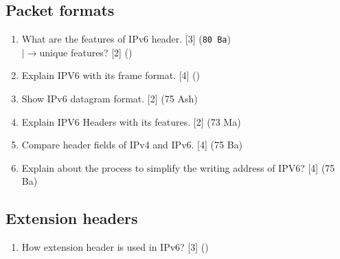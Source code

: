 \documentclass[12pt]{article}
\newcommand{\lb}{\\$\left|\rightarrow\right.$}
\begin{document}
	\subsection{Packet formats}
		\begin{enumerate}[noitemsep, topsep=0pt]
			\item What are the features of IPv6 header. \hfill [3] (\texttt{80 Ba})
			\lb unique features? \hfill [2] ()

			\item Explain IPV6 with its frame format. \hfill [4] ()

			\item Show IPv6 datagram format. \hfill [2] (75 Ash)

			\item Explain IPV6 Headers with its features. \hfill [2] (73 Ma)

			\item Compare header fields of IPv4 and IPv6. \hfill [4] (75 Ba)

			\item Explain about the process to simplify the writing address of IPV6? \hfill [4] (75 Ba)
		\end{enumerate}

	\subsection{Extension headers}
		\begin{enumerate}[noitemsep, topsep=0pt]
			\item How extension header is used in IPv6? \hfill [3] ()
		\end{enumerate}
\end{document}
